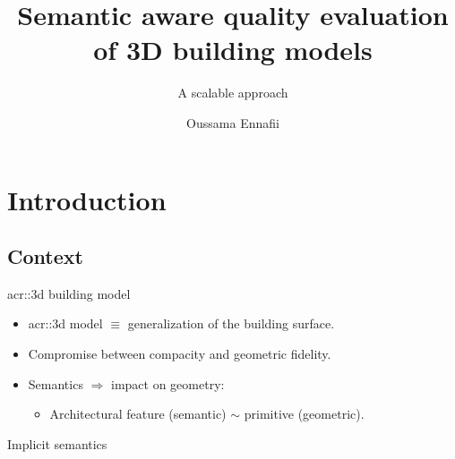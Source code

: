 \documentclass[10pt]{beamer}
\title{Semantic aware quality evaluation of 3D building models}
\subtitle{A scalable approach}
\date{\tiny \DTMdisplaydate{2020}{1}{10}{5}}
\author{
    Oussama Ennafii
}
\begin{document}
    \begin{frame}[plain]
        \titlepage
    \end{frame}

    \section{Introduction}
        \subsection{Context}
            \begin{frame}{\texorpdfstring{\acrshort*{acr::3d}}{3D} building model}
                \begin{itemize}[label=$\blacktriangleright$, font=\color{IGNGreen}]
                    \item<1-> \Acrfull{acr::3d} model \(\equiv\) generalization of the building surface.
                    \item<2-> Compromise between compacity and geometric fidelity.
                    \item<3-> Semantics \(\Rightarrow\) impact on geometry:
                        \begin{itemize}
                            \item<4-> Architectural feature (semantic) \(\sim\) primitive (geometric).
                        \end{itemize}
                \end{itemize}
            \end{frame}

            \begin{frame}{Implicit semantics}
                \begin{figure}[H]
                    \centering
                    \caption{
                    }
                \end{figure}
            \end{frame}
\end{document}
